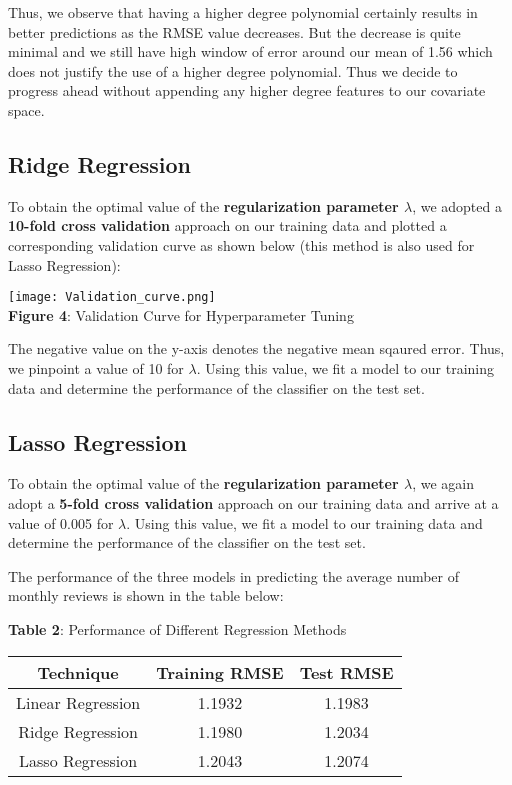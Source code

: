 \documentclass[12pt]{article}
\begin{document}
\noindent Thus, we observe that having a higher degree polynomial certainly results in better predictions as the RMSE value decreases. But the decrease is quite minimal and we still have high window of error around our mean of 1.56 which does not justify the use of a higher degree polynomial. Thus we decide to progress ahead without appending any higher degree features to our covariate space. 




\subsection*{Ridge Regression}
To obtain the optimal value of the \textbf{regularization parameter $\lambda$}, we adopted a \textbf{10-fold cross validation} approach on our training data and plotted a corresponding validation curve as shown below (this method is also used for Lasso Regression): 

\begin{center}
\texttt{[image: Validation\_curve.png]}
\\\textbf{Figure 4}: Validation Curve for Hyperparameter Tuning
\end{center}

\noindent The negative value on the y-axis denotes the negative mean sqaured error. Thus, we pinpoint a value of 10 for $\lambda$. Using this value, we fit a model to our training data and determine the performance of the classifier on the test set.



\subsection*{Lasso Regression}
To obtain the optimal value of the \textbf{regularization parameter $\lambda$}, we again adopt a \textbf{5-fold cross validation} approach on our training data and arrive at a value of 0.005 for $\lambda$. Using this value, we fit a model to our training data and determine the performance of the classifier on the test set.

\noindent The performance of the three models in predicting the average number of monthly reviews is shown in the table below:

\begin{center}
\textbf{Table 2}: Performance of Different Regression Methods \\[0.3cm] 
\begin{tabular}{ |c|c|c| } 
 \hline

  \textbf{Technique}& \textbf{Training RMSE}  & \textbf{Test RMSE} \\ [0.1cm]
 \hline
 Linear Regression &1.1932 &1.1983 \\ 
 \hline
 Ridge Regression  &1.1980 &1.2034 \\ 
 \hline
 Lasso Regression  &1.2043 &1.2074 \\
 \hline

\end{tabular}

\end{center}
\end{document}

